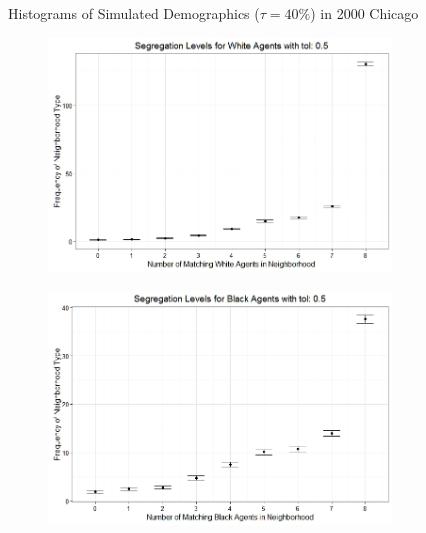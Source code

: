 \begin{figure}[h!]
\begin{subfigure}{.5\textwidth}
\end{subfigure}
\caption[Simulated Demographics ($\tau = 40\%$); 2000 Chicago]{Histograms of Simulated Demographics ($\tau = 40\%$) in 2000 Chicago}
\end{figure}

\begin{figure}[h!]
\centering
\begin{subfigure}{.5\textwidth}
  \centering
\includegraphics[scale=.35]{figures/2000_5_White.jpeg}
\end{subfigure}%
\begin{subfigure}{.5\textwidth}
  \centering
\includegraphics[scale=.35]{figures/2000_5_Black.jpeg}
\end{subfigure}
\hfill \break \hfill \break
\begin{subfigure}{.5\textwidth}
  \centering

\end{subfigure}
\end{figure}
